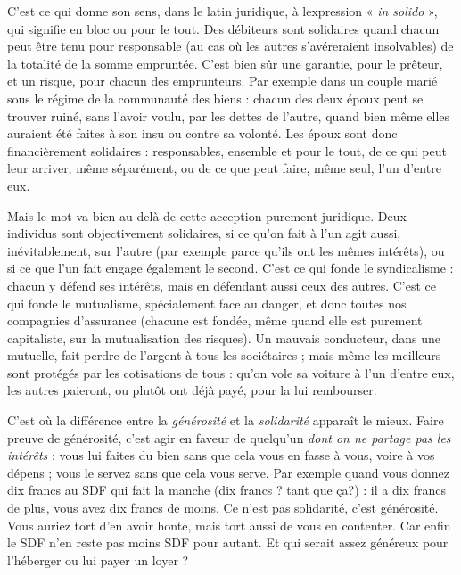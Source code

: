 C’est ce qui donne son sens, dans le latin juridique, à lexpression « {\it in
solido} », qui signifie en bloc ou pour le tout. Des débiteurs sont solidaires
quand chacun peut être tenu pour responsable (au cas où les autres s’avéreraient
insolvables) de la totalité de la somme empruntée. C’est bien sûr une
garantie, pour le prêteur, et un risque, pour chacun des emprunteurs. Par
exemple dans un couple marié sous le régime de la communauté des biens :
chacun des deux époux peut se trouver ruiné, sans l’avoir voulu, par les dettes
de l’autre, quand bien même elles auraient été faites à son insu ou contre sa
volonté. Les époux sont donc financièrement solidaires : responsables, ensemble
et pour le tout, de ce qui peut leur arriver, même séparément, ou de ce que peut
faire, même seul, l’un d’entre eux.

Mais le mot va bien au-delà de cette acception purement juridique. Deux
individus sont objectivement solidaires, si ce qu’on fait à l’un agit aussi, inévitablement,
sur l’autre (par exemple parce qu’ils ont les mêmes intérêts), ou si ce
que l’un fait engage également le second. C’est ce qui fonde le syndicalisme :
chacun y défend ses intérêts, mais en défendant aussi ceux des autres. C’est ce
qui fonde le mutualisme, spécialement face au danger, et donc toutes nos compagnies
d’assurance (chacune est fondée, même quand elle est purement capitaliste,
sur la mutualisation des risques). Un mauvais conducteur, dans une
mutuelle, fait perdre de l’argent à tous les sociétaires ; mais même les meilleurs
sont protégés par les cotisations de tous : qu’on vole sa voiture à l’un d’entre
eux, les autres paieront, ou plutôt ont déjà payé, pour la lui rembourser.

C’est où la différence entre la {\it générosité} et la {\it solidarité} apparaît le mieux.
Faire preuve de générosité, c’est agir en faveur de quelqu'un {\it dont on ne partage
pas les intérêts} : vous lui faites du bien sans que cela vous en fasse à vous, voire
à vos dépens ; vous le servez sans que cela vous serve. Par exemple quand vous
donnez dix francs au SDF qui fait la manche (dix francs ? tant que ça?) : il a
dix francs de plus, vous avez dix francs de moins. Ce n’est pas solidarité, c’est
générosité. Vous auriez tort d’en avoir honte, mais tort aussi de vous en
contenter. Car enfin le SDF n’en reste pas moins SDF pour autant. Et qui
serait assez généreux pour l’héberger ou lui payer un loyer ?

